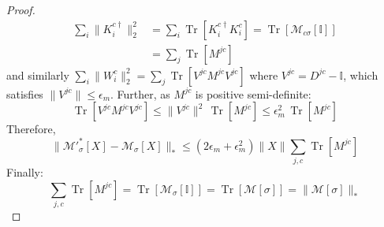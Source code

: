 \documentclass[aps,floatfix,10pt,amssymb,amsfont,amsmath,superscriptaddress,float,nofootinbib,longbibliography,nobalancelastpage,twocolumn]{revtex4-2}
\begin{document}
\begin{proof}
    \begin{align}
        \sum_i \|K^{c\dagger}_i\|^2_2&=\sum_i\operatorname{Tr}[K^{c\dagger}_iK^{c}_i]=\operatorname{Tr}[\mathcal{M}_{c\sigma}[\mathbb{I}]]\\
        &=\sum_j \operatorname{Tr}[M^{jc}]
    \end{align} and similarly $\sum_i \|W^c_i\|^2_2=\sum_j \operatorname{Tr}[V^{jc}M^{jc}V^{jc}]$ where $V^{jc} = D^{jc}-\mathbb{I}$, which satisfies $\|V^{jc}\|\leq\epsilon_m$. Further, as $M^{jc}$ is positive semi-definite:
    \begin{equation}
       \operatorname{Tr}[V^{jc}M^{jc}V^{jc}] \leq \|V^{jc}\|^2\, \operatorname{Tr}[M^{jc}] \leq \epsilon_m^2\, \operatorname{Tr}[M^{jc}]
    \end{equation}
    Therefore,
    \begin{equation}
        \|\mathcal{M}'^*_{\sigma}[X]-\mathcal{M}_\sigma[X]\|_* 
        \leq (2\epsilon_m+\epsilon_m^2)\|X\|\sum_{j,c}\operatorname{Tr}[M^{jc}] 
    \end{equation}
    Finally:
    \begin{equation}
        \sum_{j,c}\operatorname{Tr}[M^{jc}] = \operatorname{Tr}[\mathcal{M}_{\sigma}[\mathbb{I}]] = \operatorname{Tr}[\mathcal{M}[\sigma]] = \|\mathcal{M}[\sigma]\|_*
    \end{equation}
\end{proof}
\end{document}

